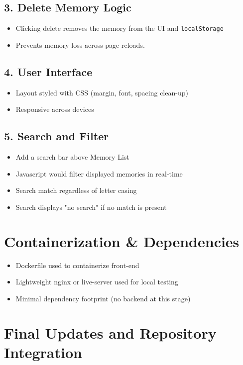 \documentclass[12pt]{article}
\begin{document}
\subsection*{3. Delete Memory Logic}
\begin{itemize}
  \item Clicking delete removes the memory from the UI and \texttt{localStorage}
  \item Prevents memory loss across page reloads.
\end{itemize}

\subsection*{4. User Interface}
\begin{itemize}
  \item Layout styled with CSS (margin, font, spacing clean-up)
  \item Responsive across devices
\end{itemize}

\subsection*{5. Search and Filter}
\begin{itemize}
  \item Add a search bar above Memory List
  \item Javascript would filter displayed memories in real-time
  \item Search match regardless of letter casing
  \item Search displays "no search" if no match is present
\end{itemize}

\section{Containerization \& Dependencies}
\begin{itemize}
  \item Dockerfile used to containerize front-end
  \item Lightweight nginx or live-server used for local testing
  \item Minimal dependency footprint (no backend at this stage)
\end{itemize}

\section{Final Updates and Repository Integration}
\end{document}
